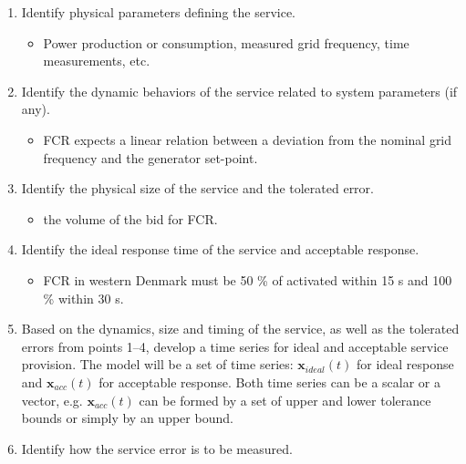 \begin{enumerate}
  \item Identify physical parameters defining the service.
  \begin{itemize}
    \item \eg Power production or consumption, measured grid frequency, time measurements, etc.%
  \end{itemize}
  \item Identify the dynamic behaviors of the service related to system parameters (if any).
  \begin{itemize}
    \item \eg FCR expects a linear relation between a deviation from the nominal grid frequency and the generator set-point.%
  \end{itemize}
  \item Identify the physical size of the service and the tolerated error. %
  \begin{itemize}
    \item \eg the volume of the bid for FCR. %
  \end{itemize}
  \item Identify the ideal response time of the service and acceptable response.
  \begin{itemize}
    \item \eg FCR in western Denmark must be 50 \% of activated within 15 s and 100 \% within 30 s.
  \end{itemize}
  \item Based on the dynamics, size and timing of the service, as well as the tolerated errors from points 1--4, develop a time series for ideal and acceptable service provision. The model will be a set of time series: $\mathbf{x}_{ideal}(t)$ for ideal response and $\mathbf{x}_{acc}(t)$ for acceptable response. Both time series can be a scalar or a vector, e.g. $\mathbf{x}_{acc}(t)$ can be formed by a set of upper and lower tolerance bounds or simply by an upper bound.
  \item Identify how the service error is to be measured.
\end{enumerate}

